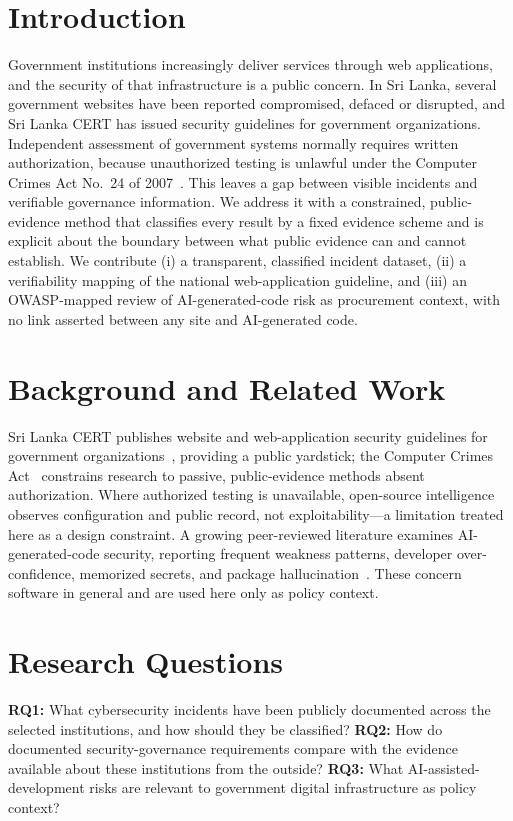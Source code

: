 \documentclass[conference]{IEEEtran}
\begin{document}
\section{Introduction}
Government institutions increasingly deliver services through web applications, and the security
of that infrastructure is a public concern. In Sri Lanka, several government websites have been
reported compromised, defaced or disrupted, and Sri Lanka CERT has issued security guidelines
for government organizations. Independent assessment of government systems normally requires
written authorization, because unauthorized testing is unlawful under the Computer Crimes Act
No.~24 of 2007~\cite{slcca2007}. This leaves a gap between visible incidents and verifiable
governance information. We address it with a constrained, public-evidence method that classifies
every result by a fixed evidence scheme and is explicit about the boundary between what public
evidence can and cannot establish. We contribute (i) a transparent, classified incident dataset,
(ii) a verifiability mapping of the national web-application guideline, and (iii) an OWASP-mapped
review of AI-generated-code risk as procurement context, with no link asserted between any site
and AI-generated code.

\section{Background and Related Work}
Sri Lanka CERT publishes website and web-application security guidelines for government
organizations~\cite{slcert2022website,slcert2022webapp}, providing a public yardstick; the
Computer Crimes Act~\cite{slcca2007} constrains research to passive, public-evidence methods
absent authorization. Where authorized testing is unavailable, open-source intelligence observes
configuration and public record, not exploitability---a limitation treated here as a design
constraint. A growing peer-reviewed literature examines AI-generated-code security, reporting
frequent weakness patterns, developer over-confidence, memorized secrets, and package
hallucination~\cite{pearce2022asleep,perry2023do,sandoval2023lost,fu2025security,vero2025baxbench,spracklen2025package,huang2024yourcode,klemmer2024using}.
These concern software in general and are used here only as policy context.

\section{Research Questions}
\textbf{RQ1:} What cybersecurity incidents have been publicly documented across the selected
institutions, and how should they be classified? \textbf{RQ2:} How do documented
security-governance requirements compare with the evidence available about these institutions
from the outside? \textbf{RQ3:} What AI-assisted-development risks are relevant to government
digital infrastructure as policy context?
\end{document}
